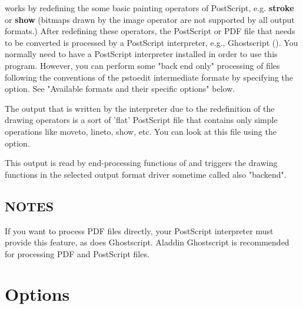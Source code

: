 \documentclass[english,a4paper]{article}
\begin{document}
 works by redefining the some basic painting operators of
PostScript, e.g. \textbf{stroke} or \textbf{show} (bitmaps drawn by the image
operator are not supported by all output formats.) After
redefining these operators, the PostScript or PDF file that needs to be
converted is processed by a PostScript interpreter, e.g., Ghostscript
(). You normally need to have a PostScript interpreter installed in
order to use this program. However, you can perform some "back end only" processing
of files following the conventions of the pstoedit intermediate formate by specifying the  option. See "Available formats and their specific options" below. 

The output that is written by the interpreter due to the redefinition of the
drawing operators is a sort of 'flat' PostScript file that contains only simple
operations like moveto, lineto, show, etc. You can look at this file using the
 option. 

This output is read by end-processing functions of  and triggers
the drawing functions in the selected output format driver sometime called also "backend". 

\subsection{NOTES}

If you want to process PDF files directly, your PostScript interpreter must
provide this feature, as does Ghostscript. Aladdin Ghostscript is
recommended for processing PDF and PostScript files.

\section{Options}
\end{document}
